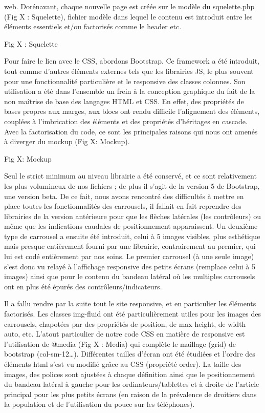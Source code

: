 \documentclass[12pt]{report}
\begin{document}
web. Dorénavant, chaque nouvelle page est créée sur le modèle du squelette.php (Fig X : Squelette),
fichier modèle dans lequel le contenu est introduit entre les éléments essentiels et/ou factorisés
comme le header etc.
\bigskip
\par
Fig X : Squelette
\bigskip
\par
Pour faire le lien avec le CSS, abordons Bootstrap. Ce framework a été introduit, tout comme
d’autres éléments externes tels que les librairies JS, le plus souvent pour une fonctionnalité
particulière et le responsive des classes colonnes. Son utilisation a été dans l’ensemble un frein à la
conception graphique du fait de la non maîtrise de base des langages HTML et CSS. En effet, des
propriétés de bases propres aux marges, aux blocs ont rendu difficile l’alignement des éléments,
couplées à l’imbrication des éléments et des propriétés d’héritages en cascade. Avec la factorisation
du code, ce sont les principales raisons qui nous ont amenés à diverger du mockup (Fig X: Mockup).
\bigskip
\par
Fig X: Mockup
\bigskip
\par
Seul le strict minimum au niveau librairie a été conservé, et ce sont relativement les plus
volumineux de nos fichiers ; de plus il s’agit de la version 5 de Bootstrap, une version beta. De ce
fait, nous avons rencontré des difficultés à mettre en place toutes les fonctionnalités des carrousels,
il fallait en fait reprendre des librairies de la version antérieure pour que les flèches latérales (les
contrôleurs) ou même que les indications caudales de positionnement apparaissent. Un deuxième
type de carrousel a ensuite été introduit, celui à 5 images visibles, plus esthétique mais presque
entièrement fourni par une librairie, contrairement au premier, qui lui est codé entièrement par nos
soins. Le premier carrousel (à une seule image) s’est donc vu relayé à l’affichage responsive des
petits écrans (remplace celui à 5 images) ainsi que pour le contenu du bandeau latéral où les
multiples carrousels ont en plus été épurés des contrôleurs/indicateurs.
\bigskip
\par
Il a fallu rendre par la suite tout le site responsive, et en particulier les éléments factorisés. Les classes img-fluid ont été particulièrement utiles pour les images des carrousels, chapotées par des propriétés de position, de max height, de width auto, etc. L’atout particulier de notre code CSS en matière de responsive est l’utilisation de @media (Fig X : Media) qui complète le maillage (grid) de bootstrap (col-sm-12…). Différentes tailles d’écran ont été étudiées et l’ordre des éléments html s’est vu modifié grâce au CSS (propriété order). La taille des images, des polices sont ajustées à chaque définition ainsi que le positionnement du bandeau latéral à gauche pour les ordinateurs/tablettes et à droite de l’article principal pour les plus petits écrans (en raison de la prévalence de droitiers dans la population et de l’utilisation du pouce sur les téléphones).
\end{document}
